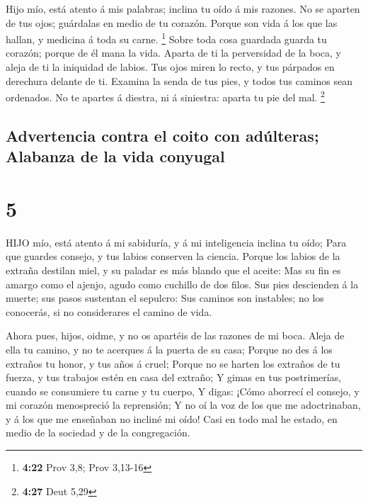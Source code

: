  Hijo mío, está atento á mis palabras; inclina tu oído á
mis razones.  No se aparten de tus ojos; guárdalas en medio
de tu corazón.  Porque son vida á los que las hallan, y
medicina á toda su carne. \footnote{\textbf{4:22} Prov 3,8; Prov 3,13-16}
 Sobre toda cosa guardada guarda tu corazón; porque de él
mana la vida.  Aparta de ti la perversidad de la boca, y
aleja de ti la iniquidad de labios.  Tus ojos miren lo
recto, y tus párpados en derechura delante de ti.  Examina
la senda de tus pies, y todos tus caminos sean ordenados. 
No te apartes á diestra, ni á siniestra: aparta tu pie del mal.
\footnote{\textbf{4:27} Deut 5,29}

\hypertarget{advertencia-contra-el-coito-con-aduxfalteras-alabanza-de-la-vida-conyugal}{%
\subsection{Advertencia contra el coito con adúlteras; Alabanza de la
vida
conyugal}\label{advertencia-contra-el-coito-con-aduxfalteras-alabanza-de-la-vida-conyugal}}

\hypertarget{section-4}{%
\section{5}\label{section-4}}

 HIJO mío, está atento á mi sabiduría, y á mi inteligencia
inclina tu oído;  Para que guardes consejo, y tus labios
conserven la ciencia.  Porque los labios de la extraña
destilan miel, y su paladar es más blando que el aceite: 
Mas su fin es amargo como el ajenjo, agudo como cuchillo de dos filos.
 Sus pies descienden á la muerte; sus pasos sustentan el
sepulcro:  Sus caminos son instables; no los conocerás, si
no considerares el camino de vida.

 Ahora pues, hijos, oidme, y no os apartéis de las razones
de mi boca.  Aleja de ella tu camino, y no te acerques á la
puerta de su casa;  Porque no des á los extraños tu honor, y
tus años á cruel;  Porque no se harten los extraños de tu
fuerza, y tus trabajos estén en casa del extraño;  Y gimas
en tus postrimerías, cuando se consumiere tu carne y tu cuerpo,
 Y digas: ¡Cómo aborrecí el consejo, y mi corazón
menospreció la reprensión;  Y no oí la voz de los que me
adoctrinaban, y á los que me enseñaban no incliné mi oído! 
Casi en todo mal he estado, en medio de la sociedad y de la
congregación.

